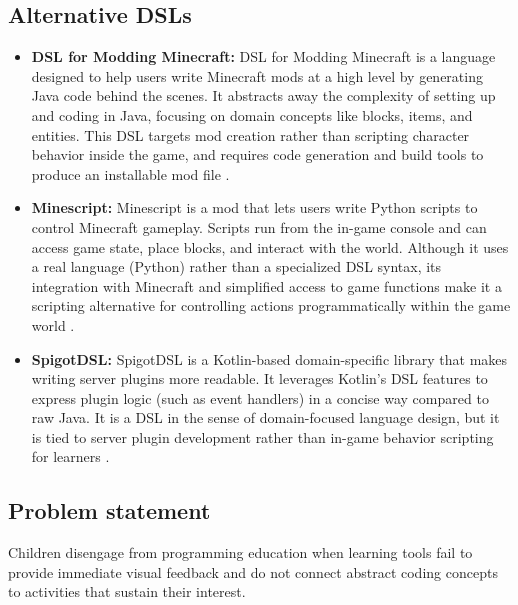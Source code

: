 \subsection{Alternative DSLs}

\begin{itemize}
    \item[\textbf{--}] \textbf{DSL for Modding Minecraft:}
    DSL for Modding Minecraft is a language designed to help users write Minecraft mods at a high level by generating Java code behind the scenes. 
    It abstracts away the complexity of setting up and coding in Java, focusing on domain concepts like blocks, items, and entities. 
    This DSL targets mod creation rather than scripting character behavior inside the game, and requires code generation and build tools to produce an installable mod file \cite{stalla_dsl_2024}.

    \item[\textbf{--}] \textbf{Minescript:}
    Minescript is a mod that lets users write Python scripts to control Minecraft gameplay. 
    Scripts run from the in-game console and can access game state, place blocks, and interact with the world. 
    Although it uses a real language (Python) rather than a specialized DSL syntax, its integration with Minecraft and simplified access to game functions make it a scripting alternative for controlling actions programmatically within the game world \cite{noauthor_minescript_nodate}.

    \item[\textbf{--}] \textbf{SpigotDSL:}
    SpigotDSL is a Kotlin-based domain-specific library that makes writing server plugins more readable. 
    It leverages Kotlin's DSL features to express plugin logic (such as event handlers) in a concise way compared to raw Java. 
    It is a DSL in the sense of domain-focused language design, but it is tied to server plugin development rather than in-game behavior scripting for learners \cite{noauthor_spigotdsl_nodate}.
\end{itemize}

\subsection{Problem statement }

Children disengage from programming education when learning tools fail to provide immediate visual feedback and do not connect abstract coding concepts to activities that sustain their interest.
